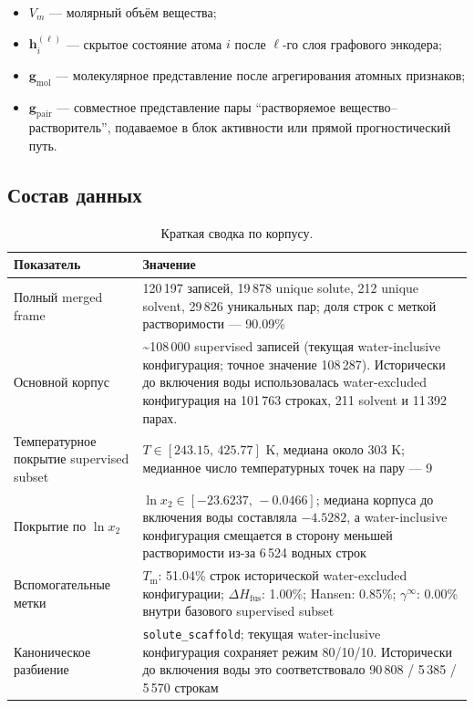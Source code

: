 \documentclass[11pt]{article}
\begin{document}
\begin{itemize}
  \item $V_m$ --- молярный объём вещества;
  \item $\mathbf{h}_i^{(\ell)}$ --- скрытое состояние атома $i$ после $\ell$-го слоя графового энкодера;
  \item $\mathbf{g}_{\mathrm{mol}}$ --- молекулярное представление после агрегирования атомных признаков;
  \item $\mathbf{g}_{\mathrm{pair}}$ --- совместное представление пары ``растворяемое вещество--растворитель'', подаваемое в блок активности или прямой прогностический путь.
\end{itemize}

\subsection{Состав данных}

\begin{table}[H]
\centering
\small
\begin{tabularx}{\textwidth}{|P{4.1cm}|Y|}
\hline
Показатель & Значение \\
\hline
Полный merged frame & 120\,197 записей, 19\,878 unique solute, 212 unique solvent, 29\,826 уникальных пар; доля строк с меткой растворимости --- 90.09\% \\
\hline
Основной корпус & \textasciitilde108\,000 supervised записей (текущая water-inclusive конфигурация; точное значение 108\,287). Исторически до включения воды использовалась water-excluded конфигурация на 101\,763 строках, 211 solvent и 11\,392 парах. \\
\hline
Температурное покрытие supervised subset & $T \in [243.15,\, 425.77]$ K, медиана около 303 K; медианное число температурных точек на пару --- 9 \\
\hline
Покрытие по $\ln x_2$ & $\ln x_2 \in [-23.6237,\, -0.0466]$; медиана корпуса до включения воды составляла $-4.5282$, а water-inclusive конфигурация смещается в сторону меньшей растворимости из-за 6\,524 водных строк \\
\hline
Вспомогательные метки & $T_{\mathrm{m}}$: 51.04\% строк исторической water-excluded конфигурации; $\Delta H_{\mathrm{fus}}$: 1.00\%; Hansen: 0.85\%; $\gamma^\infty$: 0.00\% внутри базового supervised subset \\
\hline
Каноническое разбиение & \texttt{solute\_scaffold}; текущая water-inclusive конфигурация сохраняет режим 80/10/10. Исторически до включения воды это соответствовало 90\,808 / 5\,385 / 5\,570 строкам \\
\hline
\end{tabularx}
\caption{Краткая сводка по корпусу.}
\label{tab:data-summary-brief}
\end{table}
\end{document}
